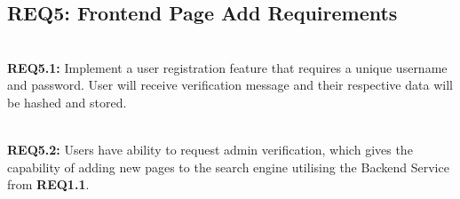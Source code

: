 \subsection{REQ5: Frontend Page Add Requirements}

\textbf{\\REQ5.1:} Implement a user registration feature that requires a unique username and password. User will receive verification message and their respective data will be hashed and stored.\par

\textbf{\\REQ5.2:} Users have ability to request admin verification, which gives the capability of adding new pages to the search engine utilising the Backend Service from \textbf{REQ1.1}.\par

